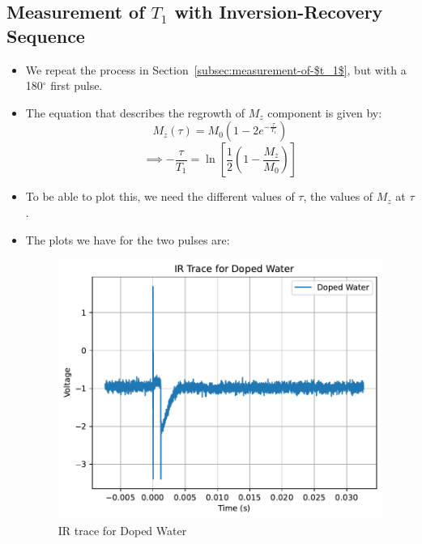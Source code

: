 \documentclass{article}
\newcommand{\degree}{$^{\circ}$ }
\begin{document}
\subsection{Measurement of $T_1$ with Inversion-Recovery Sequence}\label{subsec:measurement-of-$t_1$-with-inversion-recovery-sequence}
\begin{itemize}
    \item We repeat the process in Section~\ref{subsec:measurement-of-$t_1$}, but with a 180\degree first pulse.
    \item The equation that describes the regrowth of $M_z$ component is given by:
    \[ M_z(\tau) = M_0 \left( 1 - 2e^{-\frac{\tau}{T_1}} \right) \]
    \[ \implies -\frac{\tau}{T_1} = \ln \left[ \frac{1}{2} \left( 1 - \frac{M_z}{M_0} \right) \right] \]
    \item To be able to plot this, we need the different values of $\tau$, the values of $M_z$ at $\tau$.
    \item The plots we have for the two pulses are:
    \begin{figure}[h!]
        \centering
        \includegraphics[scale = 0.57]{../images/B4_Doped_Water}
        \caption{IR trace for Doped Water}
        \label{fig:B4_DW}
    \end{figure}


\end{itemize}
\end{document}
